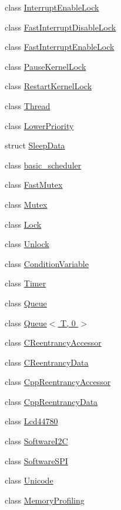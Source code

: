 \begin{DoxyCompactItemize}
class \hyperlink{classmiosix_1_1_interrupt_enable_lock}{Interrupt\-Enable\-Lock}
\item 
class \hyperlink{classmiosix_1_1_fast_interrupt_disable_lock}{Fast\-Interrupt\-Disable\-Lock}
\item 
class \hyperlink{classmiosix_1_1_fast_interrupt_enable_lock}{Fast\-Interrupt\-Enable\-Lock}
\item 
class \hyperlink{classmiosix_1_1_pause_kernel_lock}{Pause\-Kernel\-Lock}
\item 
class \hyperlink{classmiosix_1_1_restart_kernel_lock}{Restart\-Kernel\-Lock}
\item 
class \hyperlink{classmiosix_1_1_thread}{Thread}
\item 
class \hyperlink{classmiosix_1_1_lower_priority}{Lower\-Priority}
\item 
struct \hyperlink{structmiosix_1_1_sleep_data}{Sleep\-Data}
\item 
class \hyperlink{classmiosix_1_1basic__scheduler}{basic\-\_\-scheduler}
\item 
class \hyperlink{classmiosix_1_1_fast_mutex}{Fast\-Mutex}
\item 
class \hyperlink{classmiosix_1_1_mutex}{Mutex}
\item 
class \hyperlink{classmiosix_1_1_lock}{Lock}
\item 
class \hyperlink{classmiosix_1_1_unlock}{Unlock}
\item 
class \hyperlink{classmiosix_1_1_condition_variable}{Condition\-Variable}
\item 
class \hyperlink{classmiosix_1_1_timer}{Timer}
\item 
class \hyperlink{classmiosix_1_1_queue}{Queue}
\item 
class \hyperlink{classmiosix_1_1_queue_3_01_t_00_010_01_4}{Queue$<$ T, 0 $>$}
\item 
class \hyperlink{classmiosix_1_1_c_reentrancy_accessor}{C\-Reentrancy\-Accessor}
\item 
class \hyperlink{classmiosix_1_1_c_reentrancy_data}{C\-Reentrancy\-Data}
\item 
class \hyperlink{classmiosix_1_1_cpp_reentrancy_accessor}{Cpp\-Reentrancy\-Accessor}
\item 
class \hyperlink{classmiosix_1_1_cpp_reentrancy_data}{Cpp\-Reentrancy\-Data}
\item 
class \hyperlink{classmiosix_1_1_lcd44780}{Lcd44780}
\item 
class \hyperlink{classmiosix_1_1_software_i2_c}{Software\-I2\-C}
\item 
class \hyperlink{classmiosix_1_1_software_s_p_i}{Software\-S\-P\-I}
\item 
class \hyperlink{classmiosix_1_1_unicode}{Unicode}
\item 
class \hyperlink{classmiosix_1_1_memory_profiling}{Memory\-Profiling}
\end{DoxyCompactItemize}
